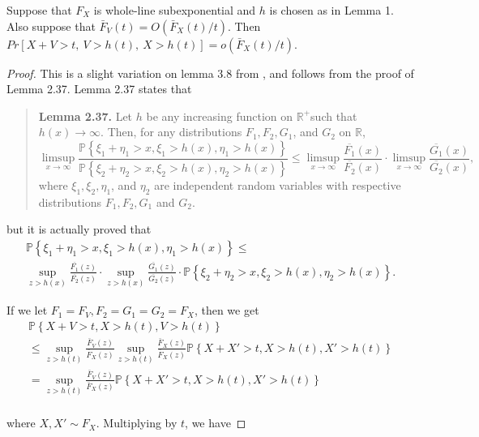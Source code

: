\documentclass[../main.tex]{subfiles}
\begin{document}
\begin{lemma}
 Suppose that \(F_X\) is whole-line subexponential and \(h\) is chosen as in Lemma 1. Also suppose that \(\bar F_V(t) = O(\bar F_X(t) / t)\). Then \(Pr[X+V>t,\ V>h(t),\ X > h(t)] = o(\bar F_X(t)/t).\)
 \end{lemma}
 
\begin{proof}

 This is a slight variation on lemma 3.8 from \citep{foss2013introduction}, and follows from the proof of Lemma 2.37. Lemma 2.37 states that

\begin{quote}
    \textbf{Lemma 2.37.} Let $h$ be any increasing function on $\mathbb{R}^{+}$such that $h(x) \rightarrow \infty$. Then, for any distributions $F_1, F_2, G_1$, and $G_2$ on $\mathbb{R}$,
$$
\limsup _{x \rightarrow \infty} \frac{\mathbb{P}\left\{\xi_1+\eta_1>x, \xi_1>h(x), \eta_1>h(x)\right\}}{\mathbb{P}\left\{\xi_2+\eta_2>x, \xi_2>h(x), \eta_2>h(x)\right\}} \leq \limsup _{x \rightarrow \infty} \frac{\overline{F_1}(x)}{\overline{F_2}(x)} \cdot \limsup _{x \rightarrow \infty} \frac{\overline{G_1}(x)}{\overline{G_2}(x)},
$$
where $\xi_1, \xi_2, \eta_1$, and $\eta_2$ are independent random variables with respective distributions $F_1, F_2, G_1$ and $G_2$.
\end{quote}

but it is actually proved that \begin{multline}\mathbb{P}\left\{\xi_1+\eta_1>x, \xi_1>h(x), \eta_1>h(x)\right\} \leq \\ \sup_{z > h(x)} \frac{\overline{F_1}(z)}{\overline{F_2}(z)} \cdot \sup_{z > h(x)} \frac{\overline{G_1}(z)}{\overline{G_2}(z)} \cdot {\mathbb{P}\left\{\xi_2+\eta_2>x, \xi_2>h(x), \eta_2>h(x)\right\}}.\end{multline}

If we let \(F_1 = F_V, F_2=G_1=G_2=F_X\), then we get  \begin{multline} \mathbb{P}\left\{X+V>t, X>h(t), V>h(t) \right\}  \\ \le \sup_{z > h(t)} \frac{\bar F_V(z)}{\bar F_X(z)} \sup_{z > h(t)} \frac{\bar F_X(z)}{\bar F_X(z)} {\mathbb{P}\left\{X+X'>t, X>h(t), X'>h(t)\right\}}\\ = \sup_{z > h(t)} \frac{\bar F_V(z)}{\bar F_X(z)} {\mathbb{P}\left\{X+X'>t, X>h(t), X'>h(t)\right\}}\\ \end{multline}

where \(X,X' \sim F_X\). Multiplying by \(t\), we have


\end{proof}
\end{document}
